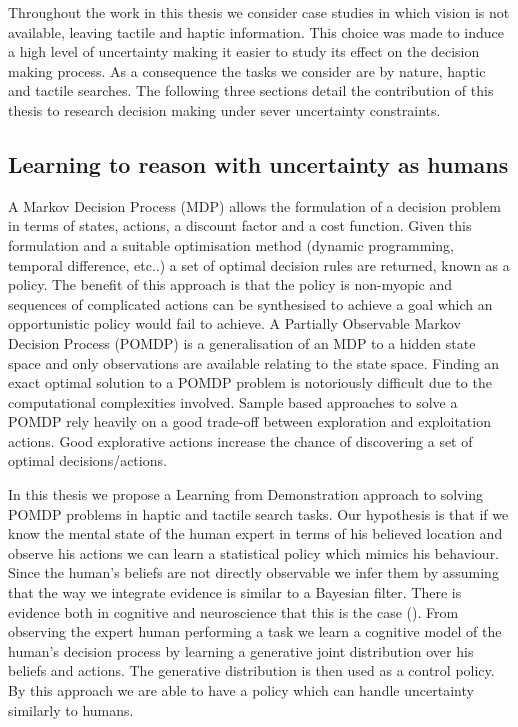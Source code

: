 Throughout the work in this thesis we consider case studies in which vision is not available, leaving tactile and 
haptic information. This choice was made to induce a high level of uncertainty making it easier to study its effect 
on the decision making process. As a consequence the tasks we consider are by nature, haptic and tactile searches.
The following three sections detail the contribution of this thesis to research decision making under sever 
uncertainty constraints.

\subsection{Learning to reason with uncertainty as humans}

A Markov Decision Process (MDP) allows the formulation of a decision problem in terms of states, actions, a discount factor 
and a cost function. Given this formulation and a suitable optimisation method (dynamic programming, temporal difference, etc..) 
a set of optimal decision rules are returned, known as a policy. The benefit of this approach 
is that the policy is non-myopic and sequences of complicated actions can be synthesised to achieve a goal which 
an opportunistic policy would fail to achieve. A Partially Observable Markov Decision Process (POMDP) is 
a generalisation of an MDP to a hidden state space and only observations are available relating 
to the state space. Finding an exact optimal solution to a POMDP problem is notoriously difficult due to 
the computational complexities involved. Sample based approaches to solve a POMDP rely heavily on 
a good trade-off between exploration and exploitation actions. Good explorative actions increase the chance of discovering 
a set of optimal decisions/actions.


In this thesis we propose a Learning from Demonstration approach to solving POMDP problems in
haptic and tactile search tasks. Our hypothesis is that if we know the mental state of the human 
expert in terms of his believed location and observe his actions we can learn a statistical policy 
which mimics his behaviour. Since the human's beliefs are not directly observable we infer them 
by assuming that the way we integrate evidence is similar to a Bayesian filter. There is   
evidence both in cognitive and neuroscience that this is the case (\cite{Bake_Saxe_Tene_2011}). From 
observing the expert human performing a task we learn a cognitive model of the human's decision process 
by learning a generative joint distribution over his beliefs and actions. The generative distribution 
is then used as a control policy. By this approach we are able to have a policy which can handle uncertainty
similarly to humans. 

